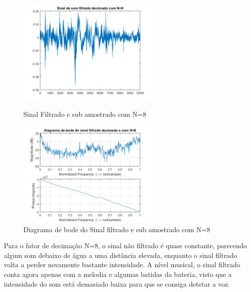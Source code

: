 \documentclass[11pt]{article}
\begin{document}
\newpage
\begin{figure}[h]
\begin{center}
\begin{minipage}[b]{0.45\linewidth}
\includegraphics[width=7cm]{fds8.png}
\caption{Sinal Filtrado e sub amostrado com N=8}
\label{figura11}
\end{minipage}
\begin{minipage}[b]{0.45\linewidth}
\includegraphics[width=7cm]{fdb8.png}
\caption{Diagrama de bode do Sinal filtrado e sub amostrado com N=8}
\label{figura}
\end{minipage}
\end{center}
\end{figure}
Para o fator de decimação N=8, o sinal não filtrado é quase constante, parecendo algum som debaixo de água a uma distância elevada, enquanto o sinal filtrado volta a perder novamente bastante intensidade. A nível musical, o sinal filtrado conta agora apenas com a melodia e algumas batidas da bateria, visto que a intensidade do som está demasiado baixa para que se consiga detetar a voz.
\newpage
\end{document}
